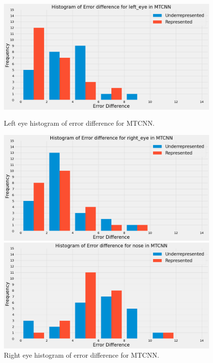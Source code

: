 \documentclass{l4proj}
\begin{document}
\begin{figure}[h!]
  \centering
  \begin{minipage}{0.49\textwidth}
    \includegraphics[width=\textwidth]{images/mtcnn_lefteye.png}
    \caption{Left eye histogram of error difference for MTCNN.}
    \label{mtcnn_lefteye}
  \end{minipage}
  \hfill
  \begin{minipage}{0.49\textwidth}
    \includegraphics[width=\textwidth]{images/mtcnn_righteye.png}
    \caption{Right eye histogram of error difference for MTCNN.}
    \label{mtcnn_righteye}
  \end{minipage}
  \hfill
  \begin{minipage}{0.51\textwidth}
    \includegraphics[width=\textwidth]{images/mtcnn_nose.png}

\end{minipage}
\end{figure}
\end{document}
